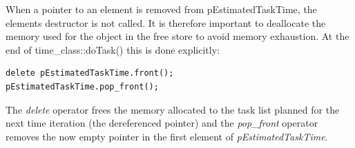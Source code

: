	When a pointer to an element is removed from pEstimatedTaskTime, the elements destructor is not called. 
	It is therefore important to deallocate the memory used for the object in the free store to avoid memory exhaustion.
	At the end of time\_class::doTask() this is done explicitly:
\begin{lstlisting}
delete pEstimatedTaskTime.front();
pEstimatedTaskTime.pop_front();
\end{lstlisting}
	The \emph{delete} operator frees the memory allocated to the task list planned for the next time iteration (the dereferenced pointer)
	and the \emph{pop\_front{}} operator removes the now empty pointer in the first element of \emph{pEstimatedTaskTime}.


	


	
	
	

